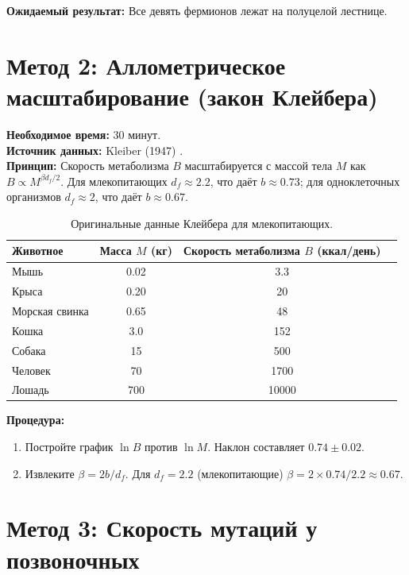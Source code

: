\documentclass[12pt,a4paper]{article}
\begin{document}
	\textbf{Ожидаемый результат:} Все девять фермионов лежат на полуцелой лестнице.
	
	\section{Метод 2: Аллометрическое масштабирование (закон Клейбера)}
	\label{sec:kleiber}
	
	\textbf{Необходимое время:} 30 минут.\\
	\textbf{Источник данных:} Kleiber (1947) \cite{Kleiber1947}.\\
	\textbf{Принцип:} Скорость метаболизма \(B\) масштабируется с массой тела \(M\) как
	\(B \propto M^{\beta d_f/2}\). Для млекопитающих \(d_f \approx 2.2\), что даёт
	\(b \approx 0.73\); для одноклеточных организмов \(d_f \approx 2\), что даёт
	\(b \approx 0.67\).
	
	\begin{table}[H]
		\centering
		\caption{Оригинальные данные Клейбера для млекопитающих.}
		\label{tab:kleiber}
		\begin{tabular}{l c c c}
			\toprule
			Животное & Масса \(M\) (кг) & Скорость метаболизма \(B\) (ккал/день) \\
			\midrule
			Мышь       & 0.02   & 3.3 \\
			Крыса      & 0.20   & 20 \\
			Морская свинка & 0.65   & 48 \\
			Кошка      & 3.0    & 152 \\
			Собака     & 15     & 500 \\
			Человек    & 70     & 1700 \\
			Лошадь     & 700    & 10000 \\
			\bottomrule
		\end{tabular}
	\end{table}
	
	\textbf{Процедура:}
	\begin{enumerate}[label=(\arabic*)]
		\item Постройте график \(\ln B\) против \(\ln M\). Наклон составляет \(0.74 \pm 0.02\).
		\item Извлеките \(\beta = 2b / d_f\). Для \(d_f = 2.2\) (млекопитающие)
		\(\beta = 2 \times 0.74 / 2.2 \approx 0.67\).
	\end{enumerate}
	
	\section{Метод 3: Скорость мутаций у позвоночных}
	\label{sec:mutation}
	
\end{document}
